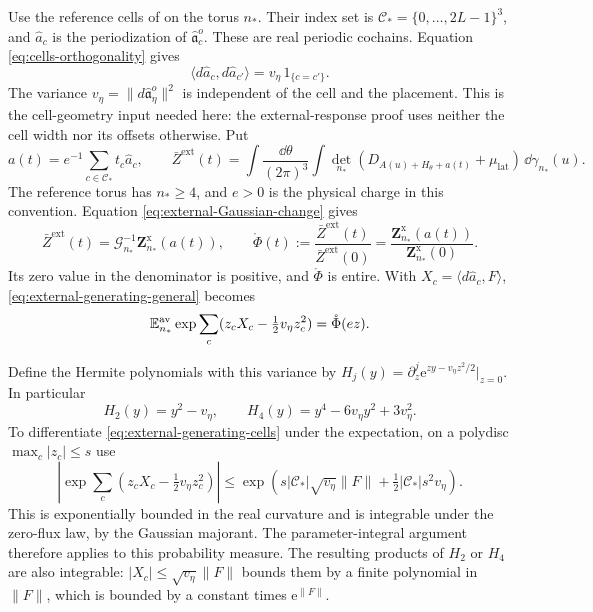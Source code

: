 Use the reference cells of 
on the torus $n_*$. Their index set is
$\mathcal C_*=\{0,\ldots,2L-1\}^3$, and
$\widehat a_c$ is the periodization of
$\hat{\mathfrak a}_c^o$. These are real periodic cochains.
Equation \eqref{eq:cells-orthogonality} gives
\begin{equation}\label{eq:external-cell-pairing}
 \langle d\widehat a_c,d\widehat a_{c'}\rangle
                         =v_\eta\,1_{\{c=c'\}}.
\end{equation}
The variance $v_\eta=\|d\hat{\mathfrak a}_\eta^o\|^2$
is independent of the cell and the placement.
This is the cell-geometry input needed here:
the external-response proof uses neither the
cell width nor its offsets otherwise. Put
\[
 a(t)=e^{-1}\sum_{c\in\mathcal C_*}t_c\widehat a_c,\qquad
 \bar Z^{\mathrm{ext}}(t)=
     \int\frac{\dd\theta}{(2\pi)^3}
        \int\det_{n_*}(D_{A(u)+H_\theta+a(t)}
                              +\mu_{\mathrm{lat}})\,\dd\gamma_{n_*}(u).
\]
The reference torus has $n_*\ge4$, and $e>0$ is
the physical charge in this convention.
Equation \eqref{eq:external-Gaussian-change} gives
\begin{equation}\label{eq:external-reference-partition}
 \bar Z^{\mathrm{ext}}(t)=
          \mathcal G_{n_*}^{-1}\mathbf Z_{n_*}^{\mathrm{x}}(a(t)),
 \qquad
 \mathring\Phi(t):=\frac{\bar Z^{\mathrm{ext}}(t)}
                           {\bar Z^{\mathrm{ext}}(0)}
        =\frac{\mathbf Z_{n_*}^{\mathrm{x}}(a(t))}
                           {\mathbf Z_{n_*}^{\mathrm{x}}(0)}.
\end{equation}
Its zero value in the denominator is positive,
and $\mathring\Phi$ is entire. With
$X_c=\langle d\widehat a_c,F\rangle$,
\eqref{eq:external-generating-general} becomes
\begin{equation}\label{eq:external-generating-cells}
 \mathbb E_{n_*}^{\mathrm{av}}
      \exp\sum_c(z_cX_c-\tfrac12v_\eta z_c^2)
                                      =\mathring\Phi(ez).
\end{equation}

Define the Hermite polynomials with this variance by
$H_j(y)=\partial_z^j \mathrm e^{zy-v_\eta z^2/2}|_{z=0}$.
In particular
\[
 H_2(y)=y^2-v_\eta,\qquad
 H_4(y)=y^4-6v_\eta y^2+3v_\eta^2.
\]
To differentiate \eqref{eq:external-generating-cells}
under the expectation, on a polydisc
$\max_c|z_c|\le s$ use
\[
 \left|\exp\sum_c(z_cX_c-\tfrac12v_\eta z_c^2)\right|
 \le
 \exp\left(s|\mathcal C_*|\sqrt{v_\eta}\|F\|
                       +\tfrac12|\mathcal C_*|s^2v_\eta\right).
\]
This is exponentially bounded in the real curvature
and is integrable under the zero-flux law, by the
Gaussian majorant. The parameter-integral argument
therefore applies to this probability measure.
The resulting products of $H_2$ or $H_4$ are also
integrable: $|X_c|\le\sqrt{v_\eta}\|F\|$ bounds them by a
finite polynomial in $\|F\|$, which is bounded by
a constant times $\mathrm e^{\|F\|}$.

